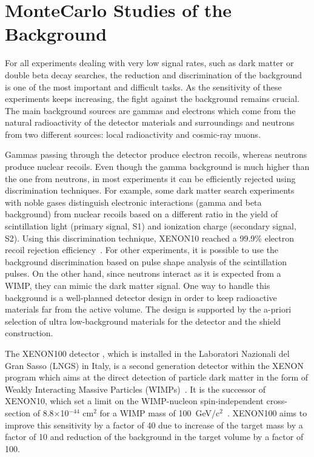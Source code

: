 \chapter{MonteCarlo Studies of the Background}
\label{ch:MC_BG}

For all experiments dealing with very low signal rates, such as dark matter
or double beta decay searches, the reduction and discrimination of the background is one of the most
important and difficult tasks. As the sensitivity of these experiments
keeps increasing, the fight against the background remains crucial.
The main background sources are gammas and electrons which come
from the natural radioactivity of the detector materials and surroundings
and neutrons from two different sources: local radioactivity and cosmic-ray muons.

Gammas passing through the detector produce electron recoils, whereas
neutrons produce nuclear recoils.
Even though the gamma background is much higher than the one from neutrons, in most experiments 
it can be efficiently rejected using discrimination techniques. 
For example, some dark matter search experiments with noble gases distinguish electronic interactions (gamma and beta 
background) from nuclear recoils based on a different ratio in the yield of
scintillation light (primary signal, S1) and ionization charge (secondary signal, S2).
Using this discrimination technique, XENON10 reached a 99.9\% electron recoil rejection 
efficiency~\cite{xe10}. For other experiments, it is possible to use the background discrimination based on pulse shape analysis of the scintillation pulses. 
On the other hand, since neutrons interact as it is expected from a WIMP, they can mimic the dark matter signal. One 
way to handle this background is a well-planned detector design in
order to keep radioactive materials far from the active volume. The design is supported by the a-priori selection of ultra low-background
materials for the detector and the shield construction.

The XENON100 detector \cite{Xe100_IDM08}, which is installed in the  Laboratori Nazionali del Gran Sasso (LNGS) in
Italy, is a second generation detector within the XENON program which aims at the direct detection of particle dark matter in the form of Weakly Interacting Massive Particles (WIMPs)~\cite{wimps}.
It is the successor of XENON10, which set a limit on the
WIMP-nucleon spin-independent cross-section of 8.8$\times$10$^{-44}$ cm$^2$ for
a  WIMP mass of 100~GeV/c$^2$~\cite{xe10}. XENON100 aims to improve this
sensitivity by a factor of 40 due to increase of the target mass by a factor
of 10 and reduction of the background in the target volume by a factor of 100.

